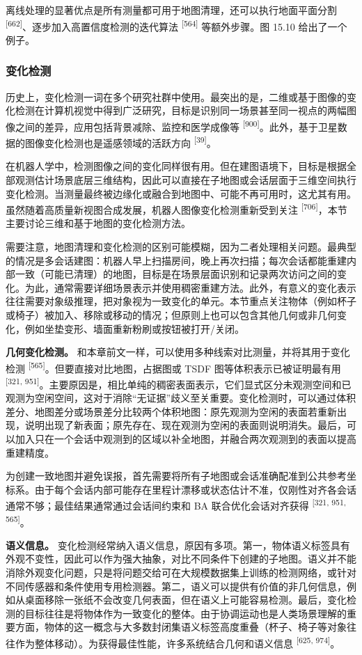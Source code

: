 离线处理的显著优点是所有测量都可用于地图清理，还可以执行地面平面分割 \textsuperscript{[662]}、逐步加入高置信度检测的迭代算法 \textsuperscript{[564]} 等额外步骤。图 15.10 给出了一个例子。

\subsubsection{变化检测}

历史上，变化检测一词在多个研究社群中使用。最突出的是，二维或基于图像的变化检测在计算机视觉中得到广泛研究，目标是识别同一场景甚至同一视点的两幅图像之间的差异，应用包括背景减除、监控和医学成像等 \textsuperscript{[900]}。此外，基于卫星数据的图像变化检测也是遥感领域的活跃方向 \textsuperscript{[39]}。

在机器人学中，检测图像之间的变化同样很有用。但在建图语境下，目标是根据全部观测估计场景底层三维结构，因此可以直接在子地图或会话层面于三维空间执行变化检测。当测量最终被边缘化或融合到地图中、可能不再可用时，这尤其有用。虽然随着高质量新视图合成发展，机器人图像变化检测重新受到关注 \textsuperscript{[706]}，本节主要讨论三维和基于地图的变化检测方法。

需要注意，地图清理和变化检测的区别可能模糊，因为二者处理相关问题。最典型的情况是多会话建图：机器人早上扫描房间，晚上再次扫描；每次会话都能重建内部一致（可能已清理）的地图，目标是在场景层面识别和记录两次访问之间的变化。为此，通常需要详细场景表示并使用稠密重建方法。此外，有意义的变化表示往往需要对象级推理，把对象视为一致变化的单元。本节重点关注物体（例如杯子或椅子）被加入、移除或移动的情况；但原则上也可以包含其他几何或非几何变化，例如坐垫变形、墙面重新粉刷或按钮被打开/关闭。

\textbf{几何变化检测。} 和本章前文一样，可以使用多种线索对比测量，并将其用于变化检测 \textsuperscript{[565]}。但要直接对比地图，占据图或 TSDF 图等体积表示已被证明最有用 \textsuperscript{[321, 951]}。主要原因是，相比单纯的稠密表面表示，它们显式区分未观测空间和已观测为空闲空间，这对于消除“无证据”歧义至关重要。变化检测时，可以通过体积差分、地图差分或场景差分比较两个体积地图：原先观测为空闲的表面若重新出现，说明出现了新表面；原先存在、现在观测为空闲的表面则说明消失。最后，可以加入只在一个会话中观测到的区域以补全地图，并融合两次观测到的表面以提高重建精度。

为创建一致地图并避免误报，首先需要将所有子地图或会话准确配准到公共参考坐标系。由于每个会话内部可能存在里程计漂移或状态估计不准，仅刚性对齐各会话通常不够；最佳结果通常通过会话间约束和 BA 联合优化会话对齐获得 \textsuperscript{[321, 951, 565]}。

\textbf{语义信息。} 变化检测经常纳入语义信息，原因有多项。第一，物体语义标签具有外观不变性，因此可以作为强大抽象，对比不同条件下创建的子地图。语义并不能消除外观变化问题，只是将问题交给可在大规模数据集上训练的检测网络，或针对不同传感器和条件使用专用检测器。第二，语义可以提供有价值的非几何信息，例如从桌面移除一张纸不会改变几何表面，但在语义上可能容易检测。最后，变化检测的目标往往是将物体作为一致变化的整体。由于协调运动也是人类场景理解的重要方面，物体的这一概念与大多数封闭集语义标签高度重叠（杯子、椅子等对象往往作为整体移动）。为获得最佳性能，许多系统结合几何和语义信息 \textsuperscript{[625, 974]}。

